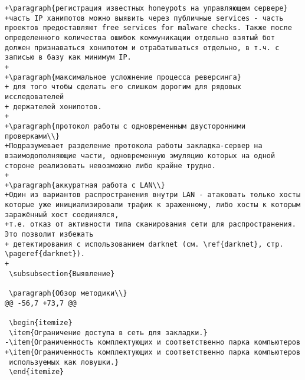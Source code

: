 \begin{verbatim}
+\paragraph{регистрация известных honeypots на управляющем сервере}
+часть IP ханипотов можно выявить через публичные services - часть проектов предоставляют free services for malware checks. Также после определенного количества ошибок коммуникации отдельно взятый бот должен признаваться хонипотом и отрабатываться отдельно, в т.ч. с записью в базу как минимум IP.
+
+\paragraph{максимальное усложнение процесса реверсинга}
+ для того чтобы сделать его слишком дорогим для рядовых исследователей
+ держателей хонипотов.
+
+\paragraph{протокол работы с одновременным двусторонними проверками\\}
+Подразумевает разделение протокола работы закладка-сервер на взаимодополняющие части, одновременную эмуляцию которых на одной стороне реализовать невозможно либо крайне трудно.
+
+\paragraph{аккуратная работа с LAN\\}
+Один из вариантов распространения внутри LAN - атаковать только хосты которые уже инициализировали трафик к зраженному, либо хосты к которым заражённый хост соединялся,
+т.е. отказ от активности типа сканирования сети для распространения. Это позволит избежать
+ детектирования с использованием darknet (см. \ref{darknet}, стр. \pageref{darknet}).
+
 \subsubsection{Выявление}

 \paragraph{Обзор методики\\}
@@ -56,7 +73,7 @@

 \begin{itemize}
 \item{Ограничение доступа в сеть для закладки.}
-\item{Ограниченность комплектующих и соответственно парка компьютеров
+\item{Ограниченность комплектующих и соответственно парка компьютеров
 используемых как ловушки.}
 \end{itemize}


\end{verbatim}

